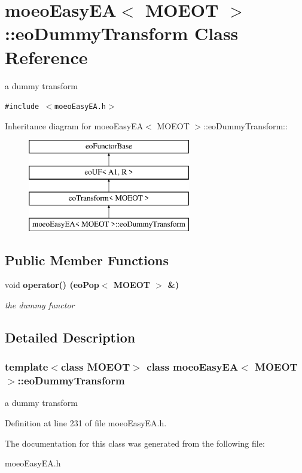 \section{moeo\-Easy\-EA$<$ MOEOT $>$::eo\-Dummy\-Transform Class Reference}
\label{classmoeoEasyEA_1_1eoDummyTransform}
a dummy transform  


{\tt \#include $<$moeo\-Easy\-EA.h$>$}

Inheritance diagram for moeo\-Easy\-EA$<$ MOEOT $>$::eo\-Dummy\-Transform::\begin{figure}[H]
\begin{center}
\leavevmode
\includegraphics[height=4cm]{classmoeoEasyEA_1_1eoDummyTransform}
\end{center}
\end{figure}
\subsection*{Public Member Functions}
\begin{CompactItemize}
\item 
void \bf{operator()} (\bf{eo\-Pop}$<$ MOEOT $>$ \&)\label{classmoeoEasyEA_1_1eoDummyTransform_0e153e482291a7f19f7f7a02505fb432}

\begin{CompactList}\small\item\em the dummy functor \item\end{CompactList}\end{CompactItemize}


\subsection{Detailed Description}
\subsubsection*{template$<$class MOEOT$>$ class moeo\-Easy\-EA$<$ MOEOT $>$::eo\-Dummy\-Transform}

a dummy transform 



Definition at line 231 of file moeo\-Easy\-EA.h.

The documentation for this class was generated from the following file:\begin{CompactItemize}
\item 
moeo\-Easy\-EA.h\end{CompactItemize}
